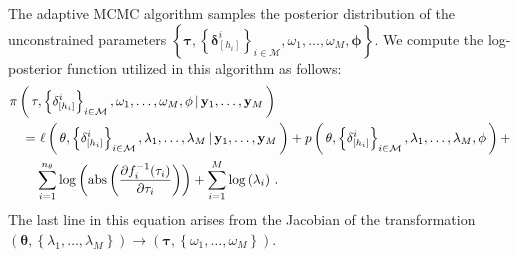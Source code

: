 \documentclass[11pt, oneside]{article}   	%
\begin{document}
The adaptive MCMC algorithm samples the posterior distribution of the unconstrained parameters $\left\{ \mathbf{\tau}, \left\{ \mathbf{\delta}_{[h_i]}^i \right\}_{i \in \mathcal{M}}, \omega_1, \ldots, \omega_M, \mathbf{\phi} \right\}$.  We compute the log-posterior function utilized in this algorithm as follows:
\begin{align*}
\MoveEqLeft \pi \left( \, \mathbf{\tau}, \left\{ \mathbf{\delta}_{[h_i]}^i \right\}_{i \in \mathcal{M}}, \omega_1, \ldots, \omega_M, \mathbf{\phi} \, | \,  \mathbf{y}_1, \ldots, \mathbf{y}_M \, \right) \\
=&~\ell \left( \, \mathbf{\theta}, \left\{ \mathbf{\delta}_{[h_i]}^i \right\}_{i \in \mathcal{M}}, \lambda_1, \ldots, \lambda_M \, | \, \mathbf{y}_1, \ldots, \mathbf{y}_M \, \right) + p \left( \, \mathbf{\theta}, \left\{ \mathbf{\delta}_{[h_i]}^i \right\}_{i \in \mathcal{M}}, \lambda_1, \ldots, \lambda_M, \mathbf{\phi} \, \right) +\\
& \sum_{i=1}^{n_\theta} \log \left( \mbox{abs}\left( \frac{\partial f_i^{-1} (\tau_i)}{\partial \tau_i} \right) \right) + \sum_{i=1}^M \log \left( \lambda_i \right) \,.
\end{align*}
The last line in this equation arises from the Jacobian of the transformation $\left( \mathbf{\theta}, \left\{\lambda_1, \ldots, \lambda_M \right\} \right) \rightarrow \left( \mathbf{\tau}, \left\{ \omega_1, \ldots, \omega_M \right\} \right)$.
\end{document}
